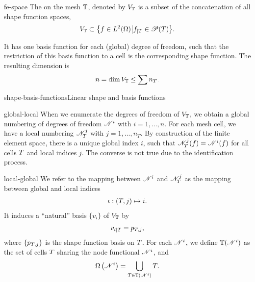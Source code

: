\begin{Definition}{fe-space}
  The  on the mesh $\mathbb T$, denoted by
  $V_\mathbb T$ is a subset of the concatenation of all shape function
  spaces,
  \begin{gather}
    V_\mathbb T \subset \bigl\{ f\in L^2(\Omega) \big|
    f_{|T} \in \mathscr P(T) \bigr\}.
  \end{gather}
  
  It has one basis function for each (global) degree of freedom, such
  that the restriction of this basis function to a cell is the
  corresponding shape function.  The resulting dimension is
  \begin{gather}
    n = \dim V_\mathbb T \le \sum n_T.
  \end{gather}
\end{Definition}

\begin{Example*}{shape-basis-functions}{Linear shape and basis functions}
  
\end{Example*}

\begin{Notation}{global-local}
  When we enumerate the degrees of freedom of $V_\mathbb T$, we obtain a
  global numbering of degrees of freedom $\mathscr N^i$ with
  $i=1,\dots,n$. For each mesh cell, we have a local numbering
  $\mathscr N_T^j$ with $j=1,\dots,n_T$. By construction of the finite
  element space, there is a unique global index $i$, such that
  $\mathscr N_T^j(f) = \mathscr N^i(f)$ for all cells $T$ and local
  indices $j$. The converse is not true due to the identification
  process.
\end{Notation}

\begin{Definition}{local-global}
  We refer to the mapping between $\mathscr N^i$ and $\mathscr N_T^j$ as
  the mapping between global and local indices
  \begin{gather}
    \iota: (T, j) \mapsto i.
  \end{gather}
  It induces a
  ``natural'' basis $\{v_i\}$ of $V_\mathbb T$ by
  \begin{gather}
    v_{i|T} = p_{T,j},
  \end{gather}
  where $\{p_{T,j}\}$ is the shape function basis on $T$. For
  each $\mathscr N^i$, we define $\mathbb T(\mathscr N^i)$ as the set of cells
  $T$ sharing the node functional $\mathscr N^i$, and
  \begin{gather}
    \Omega\left(\mathscr N^i\right) = \bigcup_{T\in \mathbb T(\mathscr N^i)} T.
  \end{gather}
\end{Definition}

